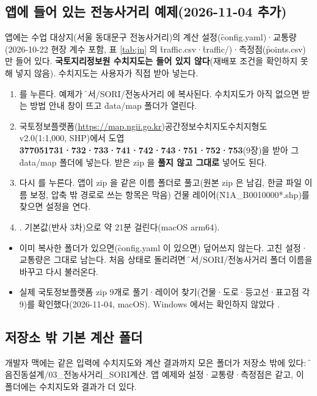 \documentclass[10.5pt,a4paper]{article}
\begin{document}
\subsection{앱에 들어 있는 전농사거리 예제(2026-11-04 추가)}
앱에는 수업 대상지(서울 동대문구 전농사거리)의 계산 설정(\f{config.yaml})·교통량(2026-10-22 현장 계수 포함, 표 \ref{tab:jn} 의 \f{traffic.csv}·\f{traffic/})·측정점(\f{points.csv})만 들어 있다. \textbf{국토지리정보원 수치지도는 들어 있지 않다}(재배포 조건을 확인하지 못해 넣지 않음). 수치지도는 사용자가 직접 받아 넣는다.
\begin{enumerate}
\item {}\menu{}를 누른다. 예제가 \f{문서/SORI/전농사거리} 에 복사된다. 수치지도가 아직 없으면 받는 방법 안내 창이 뜨고 \f{data/map} 폴더가 열린다.
\item 국토정보플랫폼(\url{https://map.ngii.go.kr})\menu 공간정보\menu 수치지도\menu 수치지형도 v2.0(1:1,000, SHP)에서 도엽 \textbf{377051731·732·733·741·742·743·751·752·753}(9장)을 받아 그 \f{data/map} 폴더에 넣는다. 받은 zip 을 \textbf{풀지 않고 그대로} 넣어도 된다.
\item 다시 \menu{}를 누른다. 앱이 zip 을 같은 이름 폴더로 풀고(원본 zip 은 남김, 한글 파일 이름 보정, 압축 밖 경로로 쓰는 항목은 막음) 건물 레이어(\f{N1A\_B0010000*.shp})를 찾으면 설정을 연다.
\item {}. 기본값(반사 3차)으로 약 21분 걸린다(macOS arm64).
\end{enumerate}
\begin{itemize}
\item 이미 복사한 폴더가 있으면(\f{config.yaml} 이 있으면) 덮어쓰지 않는다. 고친 설정·교통량은 그대로 남는다. 처음 상태로 돌리려면 \f{문서/SORI/전농사거리} 폴더 이름을 바꾸고 다시 불러온다.
\item 실제 국토정보플랫폼 zip 9개로 풀기·레이어 찾기(건물·도로·등고선·표고점 각 9)를 확인했다(2026-11-04, macOS). Windows 에서는 확인하지 않았다 \chk.
\end{itemize}

\subsection{저장소 밖 기본 계산 폴더}
개발자 맥에는 같은 입력에 수치지도와 계산 결과까지 모은 폴더가 저장소 밖에 있다: \f{소음진동설계/03\_전농사거리\_SORI계산}. 앱 예제와 설정·교통량·측정점은 같고, 이 폴더에는 수치지도와 결과가 더 있다.
\end{document}
